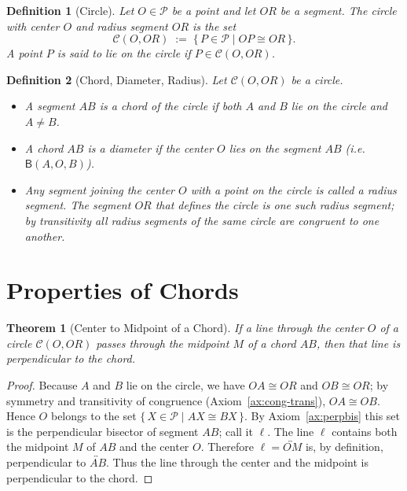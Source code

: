 \documentclass[12pt]{article}
\newtheorem{theorem}{Theorem}[section]
\newtheorem{definition}{Definition}[section]
\newcommand{\rel}[1]{\mathsf{B}(#1)}
\newcommand{\congsegment}{\cong}
\begin{document}
\begin{definition}[Circle]\label{def:circle}
Let $O\in\mathcal{P}$ be a point and let $OR$ be a segment. The \emph{circle} with center $O$ and radius segment $OR$ is the set
\[
\mathcal{C}(O,OR) \;:=\; \{\,P\in\mathcal{P} \mid OP \congsegment OR\,\}.
\]
A point $P$ is said to \emph{lie on the circle} if $P\in\mathcal{C}(O,OR)$.
\end{definition}

\begin{definition}[Chord, Diameter, Radius]\label{def:chord}
Let $\mathcal{C}(O,OR)$ be a circle.
\begin{itemize}
\item A segment $AB$ is a \emph{chord} of the circle if both $A$ and $B$ lie on the circle and $A\neq B$.
\item A chord $AB$ is a \emph{diameter} if the center $O$ lies on the segment $AB$ (i.e.\ $\rel{A,O,B}$).
\item Any segment joining the center $O$ with a point on the circle is called a \emph{radius segment}. The segment $OR$ that defines the circle is one such radius segment; by transitivity all radius segments of the same circle are congruent to one another.
\end{itemize}
\end{definition}

\section{Properties of Chords}

\begin{theorem}[Center to Midpoint of a Chord]\label{thm:center-mid}
If a line through the center $O$ of a circle $\mathcal{C}(O,OR)$ passes through the midpoint $M$ of a chord $AB$, then that line is perpendicular to the chord.
\end{theorem}

\begin{proof}
Because $A$ and $B$ lie on the circle, we have $OA\congsegment OR$ and $OB\congsegment OR$; by symmetry and transitivity of congruence (Axiom~\ref{ax:cong-trans}), $OA\congsegment OB$. Hence $O$ belongs to the set $\{\,X\in\mathcal{P}\mid AX\congsegment BX\,\}$. By Axiom~\ref{ax:perpbis} this set is the perpendicular bisector of segment $AB$; call it $\ell$. The line $\ell$ contains both the midpoint $M$ of $AB$ and the center $O$. Therefore $\ell = \overleftrightarrow{OM}$ is, by definition, perpendicular to $\overleftrightarrow{AB}$. Thus the line through the center and the midpoint is perpendicular to the chord.
\end{proof}
\end{document}

